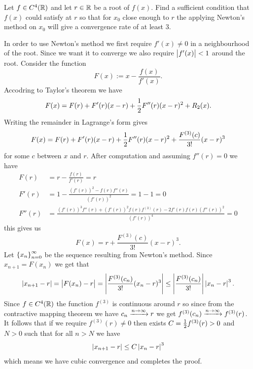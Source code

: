 \documentclass[11pt, a4paper]{article}
\begin{document}
\begin{exercise}
  Let $f \in C^4(\mathbb{R})$ and let $r \in \mathbb{R}$ be a root of $f(x)$.
  Find a sufficient condition that $f(x)$ could satisfy at $r$
  so that for $x_0$ close enough to $r$ the applying Newton's method
  on $x_0$ will give a convergence rate of at least $3$.
\end{exercise}
\begin{solution}
  In order to use Newton's method we first require $f'(x) \neq 0$ in
  a neighbourhood of the root.
  Since we want it to converge we also require $\left\lvert f'(x)\right\rvert < 1$ around the
  root.
  Consider the function
  \[
    F(x) := x - \frac{f(x)}{f'(x)}.
  \]
  Accodring to Taylor's theorem we have
  \[
    F(x) = F(r) + F'(r)(x - r) + \frac{1}{2} F''(r)(x - r)^2 + R_2(x).
  \]
  Writing the remainder in Lagrange's form gives
  \[
    F(x) = F(r) + F'(r)(x - r) + \frac{1}{2} F''(r)(x - r)^2 +
    \frac{F^{(3)}(c)}{3!}(x - r)^3
  \]
  for some $c$ between $x$ and $r$.
  After computation and assuming $f''(r) = 0$ we have
  \begin{align*}
    F(r) &= r - \frac{f(r)}{f'(r)} = r \\
    F'(r) &= 1 - \frac{(f'(r))^2 - f(r)f''(r)}{(f'(r))^2} = 1 - 1 = 0 \\
    F''(r) &=
    \frac{(f'(r))^3 f''(r) + (f'(r))^2 f(r) f^{(3)}(r) - 2 f'(r) f(r) 
    (f''(r))^2}{(f'(r))^4} = 0
  \end{align*}
  this gives us
  \[
    F(x) = r + \frac{F^{(3)}(c)}{3!}(x - r)^3.
  \]
  Let $\left\{x_n\right\}_{n=0}^{\infty}$ be the sequence resulting from Newton's
  method.
  Since $x_{n+1} = F(x_n)$ we get that
  \[
    \left\lvert x_{n+1} - r\right\rvert =
    \left\lvert F(x_n) - r\right\rvert =
    \left\lvert\frac{F^{(3)}(c_n)}{3!}(x_n - r)^3\right\rvert \le
    \left\lvert\frac{F^{(3)}(c_n)}{3!}\right\rvert\left\lvert x_n - r\right\rvert^3.
  \]
  Since $f \in C^4(\mathbb{R})$ the function $f^{(3)}$ is continuous around $r$
  so since from the contractive mapping theorem we have
  $c_n \xrightarrow{n \to \infty} r$ we get
  $f^{(3)}(c_n) \xrightarrow{n \to \infty} f^{(3)}(r)$.
  It follows that if we require $f^{(3)}(r) \neq 0$ then
  exists $C = \frac{1}{2} f^{(3)}(r) > 0$ and $N > 0$ such that for all
  $n > N$ we have
  \[
    \left\lvert x_{n+1} - r\right\rvert \le
    C \left\lvert x_n - r\right\rvert^3
  \]
  which means we have cubic convergence and completes the proof.
\end{solution}
\end{document}
